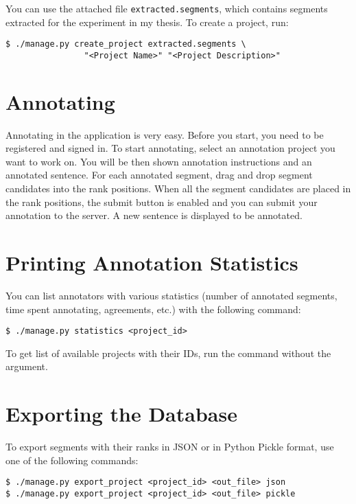 \noindent
You can use the attached file \texttt{extracted.segments}, which contains
segments extracted for the experiment in my thesis. To create a project, run:

\begin{verbatim}
$ ./manage.py create_project extracted.segments \
                "<Project Name>" "<Project Description>"
\end{verbatim}

\section{Annotating}

Annotating in the application is very easy. Before you start, you need to be
registered and signed in. To start annotating, select an annotation project you
want to work on. You will be then shown annotation instructions and an
annotated sentence.  For each annotated segment, drag and drop segment
candidates into the rank positions.  When all the segment candidates are placed
in the rank positions, the submit button is enabled and you can submit your
annotation to the server. A new sentence is displayed to be annotated. 

\section{Printing Annotation Statistics}

You can list annotators with various statistics (number of annotated segments,
time spent annotating, agreements, etc.) with the following command:

\begin{verbatim}
$ ./manage.py statistics <project_id>
\end{verbatim}

\noindent
To get list of available projects with their IDs, run the command without the
argument.

\section{Exporting the Database}

To export segments with their ranks in JSON or in Python Pickle format, use one
of the following commands:

\begin{verbatim}
$ ./manage.py export_project <project_id> <out_file> json
$ ./manage.py export_project <project_id> <out_file> pickle
\end{verbatim}

